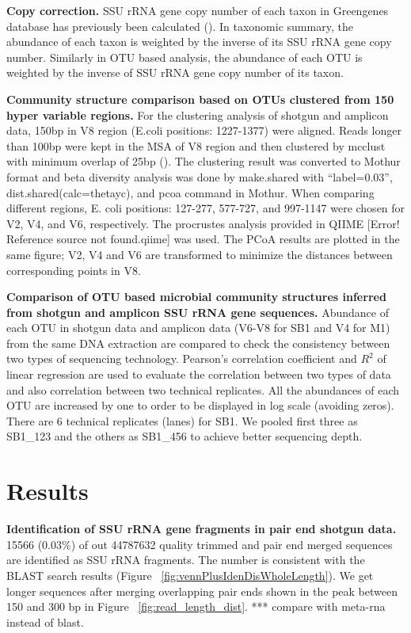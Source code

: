 \documentclass[12pt]{article}
\begin{document}
  {\bf Copy correction. }
  SSU rRNA gene copy number of each taxon in Greengenes database has previously been calculated (\cite{copyrighter}). In taxonomic summary, the abundance of each taxon is weighted by the inverse of its SSU rRNA gene copy number. Similarly in OTU based analysis, the abundance of each OTU is weighted by the inverse of SSU rRNA gene copy number of its taxon.

  {\bf Community structure comparison based on OTUs clustered from 150 hyper variable regions. }
  For the clustering analysis of shotgun and amplicon data, 150bp in V8 region (E.coli positions: 1227-1377) were aligned. Reads longer than 100bp were kept in the MSA of V8 region and then clustered by mcclust with minimum overlap of 25bp (\cite{rdp2009}). The clustering result was converted to Mothur format and beta diversity analysis was done by make.shared with ``label=0.03'', dist.shared(calc=thetayc), and pcoa command in Mothur. When comparing different regions, E. coli positions: 127-277, 577-727, and 997-1147 were chosen for V2, V4, and V6, respectively. The procrustes analysis provided in QIIME [Error! Reference source not found.qiime] was used. The PCoA results are plotted in the same figure; V2, V4 and V6 are transformed to minimize the distances between corresponding points in V8.

  {\bf Comparison of OTU based microbial community structures inferred from shotgun and amplicon SSU rRNA gene sequences. }
Abundance of each OTU in shotgun data and amplicon data (V6-V8 for SB1 and V4 for M1) from the same DNA extraction are compared to check the consistency between two types of sequencing technology. Pearson’s correlation coefficient and $R^2$ of linear regression are used to evaluate the correlation between two types of data and also correlation between two technical replicates. All the abundances of each OTU are increased by one to order to be displayed in log scale (avoiding zeros). There are 6 technical replicates (lanes) for SB1. We pooled first three as SB1\_123 and the others as SB1\_456 to achieve better sequencing depth.

\section{Results}
  {\bf Identification of SSU rRNA gene fragments in pair end shotgun data. }
  15566  (0.03\%) of out 44787632 quality trimmed and pair end merged sequences are identified as SSU rRNA fragments. The number is consistent with the BLAST search results (Figure ~\ref{fig:vennPlusIdenDisWholeLength}). We get longer sequences after merging overlapping pair ends shown in the peak between 150 and 300 bp in Figure ~\ref{fig:read_length_dist}. 
  *** compare with meta-rna instead of blast.
\end{document}
